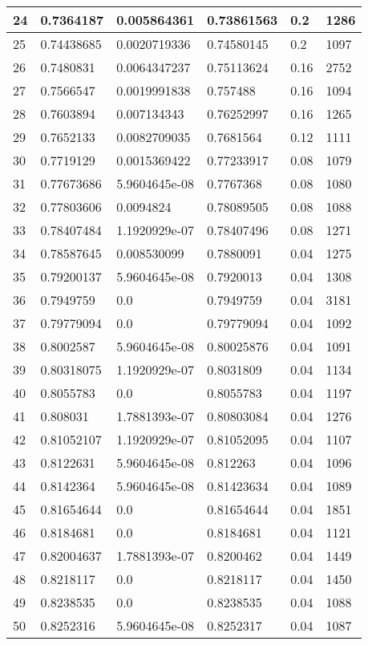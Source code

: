 \begin{longtable}{|l|l|l|l|l|l|}
24 & 0.7364187 & 0.005864361 & 0.73861563 & 0.2 & 1286 \\ \hline 
25 & 0.74438685 & 0.0020719336 & 0.74580145 & 0.2 & 1097 \\ \hline 
26 & 0.7480831 & 0.0064347237 & 0.75113624 & 0.16 & 2752 \\ \hline 
27 & 0.7566547 & 0.0019991838 & 0.757488 & 0.16 & 1094 \\ \hline 
28 & 0.7603894 & 0.007134343 & 0.76252997 & 0.16 & 1265 \\ \hline 
29 & 0.7652133 & 0.0082709035 & 0.7681564 & 0.12 & 1111 \\ \hline 
30 & 0.7719129 & 0.0015369422 & 0.77233917 & 0.08 & 1079 \\ \hline 
31 & 0.77673686 & 5.9604645e-08 & 0.7767368 & 0.08 & 1080 \\ \hline 
32 & 0.77803606 & 0.0094824 & 0.78089505 & 0.08 & 1088 \\ \hline 
33 & 0.78407484 & 1.1920929e-07 & 0.78407496 & 0.08 & 1271 \\ \hline 
34 & 0.78587645 & 0.008530099 & 0.7880091 & 0.04 & 1275 \\ \hline 
35 & 0.79200137 & 5.9604645e-08 & 0.7920013 & 0.04 & 1308 \\ \hline 
36 & 0.7949759 & 0.0 & 0.7949759 & 0.04 & 3181 \\ \hline 
37 & 0.79779094 & 0.0 & 0.79779094 & 0.04 & 1092 \\ \hline 
38 & 0.8002587 & 5.9604645e-08 & 0.80025876 & 0.04 & 1091 \\ \hline 
39 & 0.80318075 & 1.1920929e-07 & 0.8031809 & 0.04 & 1134 \\ \hline 
40 & 0.8055783 & 0.0 & 0.8055783 & 0.04 & 1197 \\ \hline 
41 & 0.808031 & 1.7881393e-07 & 0.80803084 & 0.04 & 1276 \\ \hline 
42 & 0.81052107 & 1.1920929e-07 & 0.81052095 & 0.04 & 1107 \\ \hline 
43 & 0.8122631 & 5.9604645e-08 & 0.812263 & 0.04 & 1096 \\ \hline 
44 & 0.8142364 & 5.9604645e-08 & 0.81423634 & 0.04 & 1089 \\ \hline 
45 & 0.81654644 & 0.0 & 0.81654644 & 0.04 & 1851 \\ \hline 
46 & 0.8184681 & 0.0 & 0.8184681 & 0.04 & 1121 \\ \hline 
47 & 0.82004637 & 1.7881393e-07 & 0.8200462 & 0.04 & 1449 \\ \hline 
48 & 0.8218117 & 0.0 & 0.8218117 & 0.04 & 1450 \\ \hline 
49 & 0.8238535 & 0.0 & 0.8238535 & 0.04 & 1088 \\ \hline 
50 & 0.8252316 & 5.9604645e-08 & 0.8252317 & 0.04 & 1087 \\ \hline 
\end{longtable}